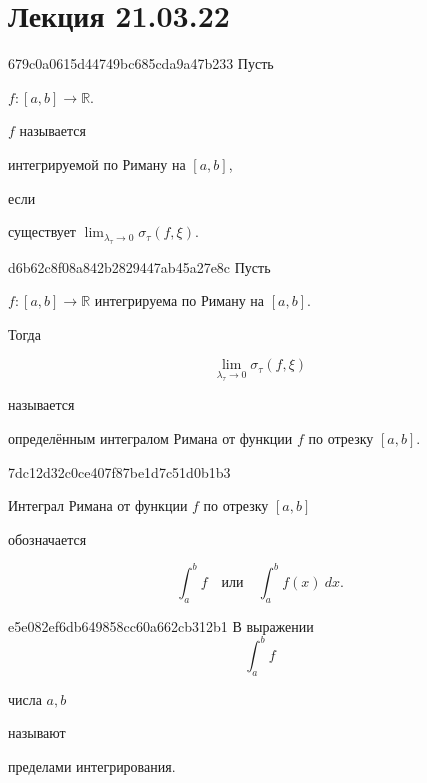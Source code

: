 \section{Лекция 21.03.22}
\begin{note}{679c0a0615d44749bc685cda9a47b233}
    Пусть \begin{icloze}{3}\( f : [a, b] \to \mathbb R \).\end{icloze} \( f \) называется \begin{icloze}{2}интегрируемой по Риману на \( [a, b] \),\end{icloze} если \begin{icloze}{1}существует \( \displaystyle \lim_{\lambda_\tau \to 0} \sigma_\tau(f, \xi) \).\end{icloze}
\end{note}

\begin{note}{d6b62c8f08a842b2829447ab45a27e8c}
    Пусть \begin{icloze}{3}\({ f : [a, b] \to \mathbb R }\) интегрируема по Риману на \( [a, b] \).\end{icloze} Тогда
    \begin{icloze}{2}
        \[
            \lim_{\lambda_\tau \to 0} \sigma_\tau(f, \xi)
        \]
    \end{icloze}
    называется \begin{icloze}{1}определённым интегралом Римана от функции \( f \) по отрезку \( [a, b] \).\end{icloze}
\end{note}

\begin{note}{7dc12d32c0ce407f87be1d7c51d0b1b3}
    \begin{icloze}{2}Интеграл Римана от функции \( f \) по отрезку \( [a, b] \)\end{icloze} обозначается
    \begin{icloze}{1}
        \[
            \int_{a}^{b} f \quad \text{или} \quad \int_{a}^{b} f(x)\: dx.
        \]
    \end{icloze}
\end{note}

\begin{note}{e5e082ef6db649858cc60a662cb312b1}
    В выражении
    \[
        \int_{a}^{b} f
    \]
    \begin{icloze}{2}числа \( a, b \)\end{icloze} называют \begin{icloze}{1}пределами интегрирования.\end{icloze}
\end{note}

